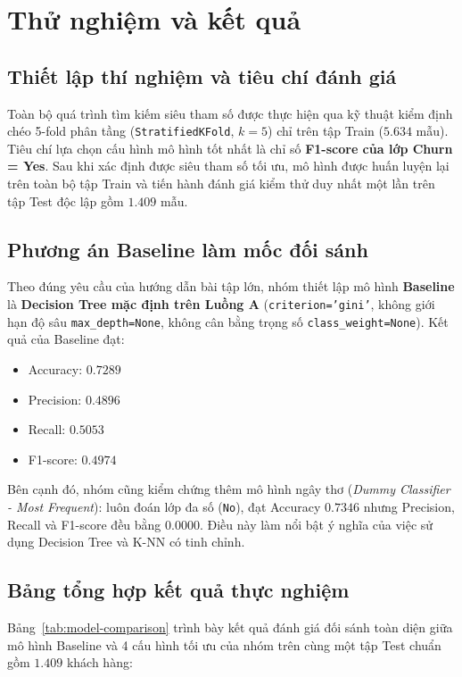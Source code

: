 \documentclass[12pt,a4paper]{article}
\begin{document}
\section{Thử nghiệm và kết quả}

\subsection{Thiết lập thí nghiệm và tiêu chí đánh giá}
Toàn bộ quá trình tìm kiếm siêu tham số được thực hiện qua kỹ thuật kiểm định chéo 5-fold phân tầng (\texttt{StratifiedKFold}, $k=5$) chỉ trên tập Train ($5.634$ mẫu). Tiêu chí lựa chọn cấu hình mô hình tốt nhất là chỉ số \textbf{F1-score của lớp Churn = Yes}. Sau khi xác định được siêu tham số tối ưu, mô hình được huấn luyện lại trên toàn bộ tập Train và tiến hành đánh giá kiểm thử duy nhất một lần trên tập Test độc lập gồm $1.409$ mẫu.

\subsection{Phương án Baseline làm mốc đối sánh}
Theo đúng yêu cầu của hướng dẫn bài tập lớn, nhóm thiết lập mô hình \textbf{Baseline} là \textbf{Decision Tree mặc định trên Luồng A} (\texttt{criterion='gini'}, không giới hạn độ sâu \texttt{max\_depth=None}, không cân bằng trọng số \texttt{class\_weight=None}). Kết quả của Baseline đạt:
\begin{itemize}
    \item Accuracy: $0.7289$
    \item Precision: $0.4896$
    \item Recall: $0.5053$
    \item F1-score: $0.4974$
\end{itemize}
Bên cạnh đó, nhóm cũng kiểm chứng thêm mô hình ngây thơ (\textit{Dummy Classifier - Most Frequent}): luôn đoán lớp đa số (\texttt{No}), đạt Accuracy $0.7346$ nhưng Precision, Recall và F1-score đều bằng $0.0000$. Điều này làm nổi bật ý nghĩa của việc sử dụng Decision Tree và K-NN có tinh chỉnh.

\subsection{Bảng tổng hợp kết quả thực nghiệm}
Bảng~\ref{tab:model-comparison} trình bày kết quả đánh giá đối sánh toàn diện giữa mô hình Baseline và 4 cấu hình tối ưu của nhóm trên cùng một tập Test chuẩn gồm $1.409$ khách hàng:
\end{document}
